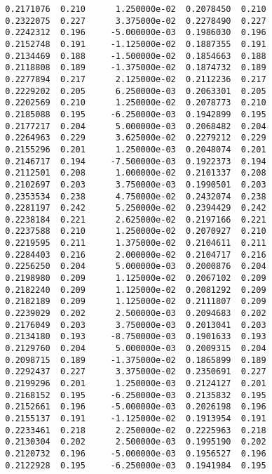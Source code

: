 \documentclass[
  letterpaper,
  DIV=11,
  numbers=noendperiod]{scrartcl}
\begin{document}
\begin{verbatim}
  0.2171076  0.210      1.250000e-02  0.2078450  0.210           
  0.2322075  0.227      3.375000e-02  0.2278490  0.227           
  0.2242312  0.196     -5.000000e-03  0.1986030  0.196           
  0.2152748  0.191     -1.125000e-02  0.1887355  0.191           
  0.2134469  0.188     -1.500000e-02  0.1854663  0.188           
  0.2118808  0.189     -1.375000e-02  0.1874732  0.189           
  0.2277894  0.217      2.125000e-02  0.2112236  0.217           
  0.2229202  0.205      6.250000e-03  0.2063301  0.205           
  0.2202569  0.210      1.250000e-02  0.2078773  0.210           
  0.2185088  0.195     -6.250000e-03  0.1942899  0.195           
  0.2177217  0.204      5.000000e-03  0.2068482  0.204           
  0.2264963  0.229      3.625000e-02  0.2279212  0.229           
  0.2155296  0.201      1.250000e-03  0.2048074  0.201           
  0.2146717  0.194     -7.500000e-03  0.1922373  0.194           
  0.2112501  0.208      1.000000e-02  0.2101337  0.208           
  0.2102697  0.203      3.750000e-03  0.1990501  0.203           
  0.2353534  0.238      4.750000e-02  0.2432074  0.238           
  0.2281197  0.242      5.250000e-02  0.2394429  0.242           
  0.2238184  0.221      2.625000e-02  0.2197166  0.221           
  0.2237588  0.210      1.250000e-02  0.2070927  0.210           
  0.2219595  0.211      1.375000e-02  0.2104611  0.211           
  0.2284403  0.216      2.000000e-02  0.2104717  0.216           
  0.2256250  0.204      5.000000e-03  0.2000876  0.204           
  0.2198980  0.209      1.125000e-02  0.2067102  0.209           
  0.2182240  0.209      1.125000e-02  0.2081292  0.209           
  0.2182189  0.209      1.125000e-02  0.2111807  0.209           
  0.2239029  0.202      2.500000e-03  0.2094683  0.202           
  0.2176049  0.203      3.750000e-03  0.2013041  0.203           
  0.2134180  0.193     -8.750000e-03  0.1901633  0.193           
  0.2129760  0.204      5.000000e-03  0.2009315  0.204           
  0.2098715  0.189     -1.375000e-02  0.1865899  0.189           
  0.2292437  0.227      3.375000e-02  0.2350691  0.227           
  0.2199296  0.201      1.250000e-03  0.2124127  0.201           
  0.2168152  0.195     -6.250000e-03  0.2135832  0.195           
  0.2152661  0.196     -5.000000e-03  0.2026198  0.196           
  0.2155137  0.191     -1.125000e-02  0.1913954  0.191           
  0.2233461  0.218      2.250000e-02  0.2225963  0.218           
  0.2130304  0.202      2.500000e-03  0.1995190  0.202           
  0.2120732  0.196     -5.000000e-03  0.1956527  0.196           
  0.2122928  0.195     -6.250000e-03  0.1941984  0.195           

\end{verbatim}
\end{document}
